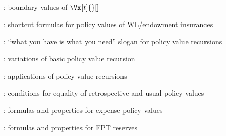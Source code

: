 \subsection*{}
\item {}: boundary values of \(\Vx[t]{}[]\)
\item {}: shortcut formulas for policy values of WL/endowment insurances
\item {}: ``what you have is what you need'' slogan for policy value recursions
\item {}: variations of basic policy value recursion
\item {}: applications of policy value recursions
\item {}: conditions for equality of retrospective and usual policy values
\item {}: formulas and properties for expense policy values
\item {}: formulas and properties for FPT reserves
